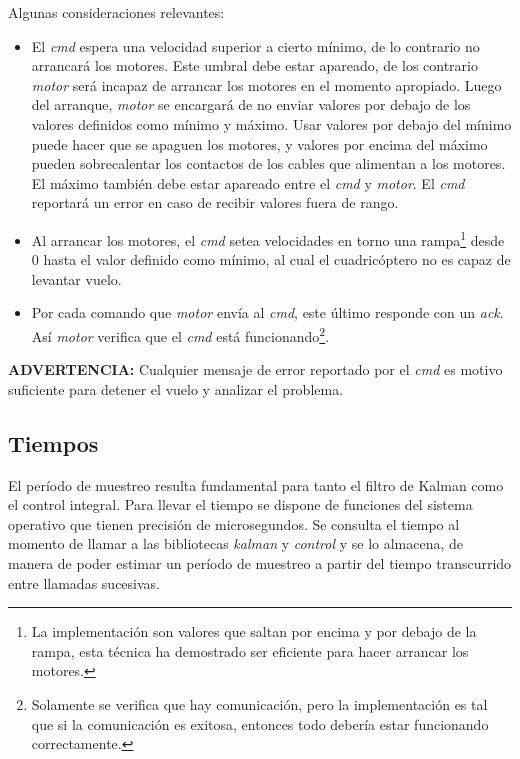 \documentclass[main]{subfiles}
\begin{document}
Algunas consideraciones relevantes:
\begin{itemize}
\item El \textit{cmd} espera una velocidad superior a cierto m\'inimo, de lo contrario no arrancar\'a los motores. Este umbral debe estar apareado, de los contrario \textit{motor} ser\'a incapaz de arrancar los motores en el momento apropiado.\newline
Luego del arranque, \textit{motor} se encargar\'a de no enviar valores por debajo de los valores definidos como m\'inimo y m\'aximo. Usar valores por debajo del m\'inimo puede hacer que se apaguen los motores, y valores por encima del m\'aximo pueden sobrecalentar los contactos de los cables que alimentan a los motores. El m\'aximo tambi\'en debe estar apareado entre el \textit{cmd} y \textit{motor}.\newline
El \textit{cmd} reportar\'a un error en caso de recibir valores fuera de rango.

\item Al arrancar los motores, el \textit{cmd} setea velocidades en torno una rampa\footnote{La implementaci\'on son valores que saltan por encima y por debajo de la rampa, esta t\'ecnica ha demostrado ser eficiente para hacer arrancar los motores.} desde 0 hasta el valor definido como m\'inimo, al cual el cuadric\'optero no es capaz de levantar vuelo.

\item Por cada comando que \textit{motor} env\'ia al \textit{cmd}, este \'ultimo responde con un \textit{ack}. Así \textit{motor} verifica que el \textit{cmd} est\'a funcionando\footnote{Solamente se verifica que hay comunicaci\'on, pero la implementaci\'on es tal que si la comunicaci\'on es exitosa, entonces todo deber\'ia estar funcionando correctamente.}.

\end{itemize}

\textbf{ADVERTENCIA:} Cualquier mensaje de error reportado por el \textit{cmd} es motivo suficiente para detener el vuelo y analizar el problema.

\subsection{Tiempos}
\label{sec:software:tiempos}

El per\'iodo de muestreo resulta fundamental para tanto el filtro de Kalman como el control integral. Para llevar el tiempo se dispone de funciones del sistema operativo que tienen precisi\'on de microsegundos. Se consulta el tiempo al momento de llamar a las bibliotecas \textit{kalman} y \textit{control} y se lo almacena, de manera de poder estimar un per\'iodo de muestreo a partir del tiempo transcurrido entre llamadas sucesivas.
\end{document}
